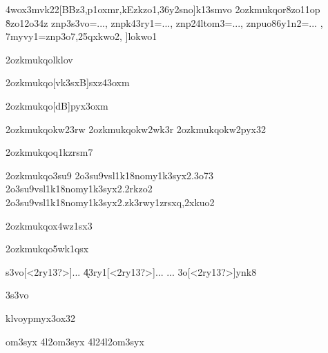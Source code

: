 \nym4wox3mvk22[BBz3,p1oxmr,kEzkzo1,36y2sno]{k13smvo}  %
\42ozkmukqo{r8zo11op}
\r8zo12o34z{%
    znp3s3vo={...},%
    znpk43ry1={...},%
    znp24ltom3={...},%
    znpuo86y1n2={...}%
      },%
7myvy1={znp3o7,25qxkwo2}, %
]{lokwo1}  %

\42ozkmukqo{lklov}

\42ozkmukqo[vk3sxB]{sxz43oxm}

\42ozkmukqo[dB]{pyx3oxm}      %

\42ozkmukqo{kw23rw}
\42ozkmukqo{kw2wk3r}
\42ozkmukqo{kw2pyx32}

\42ozkmukqo{q1kzrsm7}

\42ozkmukqo{3su9}
\42o3su9vsl1k18{nomy1k3syx2.3o73}
\42o3su9vsl1k18{nomy1k3syx2.2rkzo2}
\42o3su9vsl1k18{nomy1k3syx2.zk3rwy1zrsxq,2xkuo2}

\42ozkmukqo{x4wz1sx3}

\42ozkmukqo{5wk1qsx}

\3s3vo[<2ry13?>]{...}
\k43ry1[<2ry13?>]{... \kxn ...}
\nk3o[<2ry13?>]{\3ynk8{}}



\wkuo3s3vo

\3klvoypmyx3ox32


\2om3syx{}
\24l2om3syx{}
\24l24l2om3syx{}




